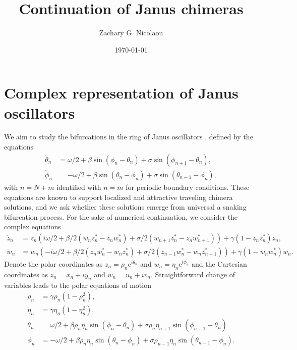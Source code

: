 \documentclass[aps,pre,amsmath,amssymb,floatfix,onecolumn,notitlepage,10pt]{revtex4-1}
\begin{document}
\title{Continuation of Janus chimeras}
\author{Zachary G. Nicolaou}
\date{\today}

\maketitle

\section{Complex  representation of Janus oscillators}
We aim to study the bifurcations in the ring of Janus oscillators \cite{2019_Nicolaou}, defined by the equations
\begin{align}
\dot{\theta}_n &= \omega/2 + \beta\sin(\phi_n - \theta_n) + \sigma \sin(\phi_{n+1}-\theta_n), \label{janus1}\\
\dot{\phi}_n &= -\omega/2 + \beta\sin(\theta_n - \phi_n) + \sigma \sin(\theta_{n-1}-\phi_n), \label{janus2}
\end{align}
with $n=N+m$ identified with $n=m$ for periodic boundary conditions. These equations are known to support localized and attractive traveling chimera solutions, and we ask whether these solutions emerge from universal a snaking bifurcation process.
For the sake of numerical continuation, we consider the complex equations
\begin{align}
\dot z_n &= z_n\left( i\omega/2 + \beta/2\left(w_nz_n^*-z_nw_n^*\right) + \sigma/2\left(w_{n+1}z_n^*-z_nw_{n+1}^*\right)\right) + \gamma\left(1-z_nz_n^*\right)z_n, \label{eom1} \\
\dot w_n &= w_n\left( -i\omega/2 + \beta/2\left(z_nw_n^*-w_nz_n^*\right) + \sigma/2\left(z_{n-1}w_n^*-w_nz_{n-1}^*\right)\right) + \gamma\left(1-w_nw_n^*\right)w_n. \label{eom2}
\end{align}
Denote the polar coordinates as $z_n = \rho_n{\mathrm e}^{i\theta_n}$ and $w_n = \eta_n{\mathrm e}^{i\phi_n}$ and the Cartesian coordinates as $z_n = x_n + iy_n$ and $w_n = u_n+iv_n$. Straightforward change of variables leads to the polar equations of motion
\begin{align}
\dot \rho_n &= \gamma \rho_n \left(1-\rho_n^2\right), \\
\dot \eta_n &=  \gamma \eta_n \left(1-\eta_n^2\right),  \\
\dot \theta_n &= \omega/2 + \beta \rho_n \eta_n \sin\left(\phi_n-\theta_n\right) + \sigma \rho_n\eta_{n+1}\sin\left(\phi_{n+1}-\theta_n\right)\\
\dot \phi_n &= -\omega/2 + \beta \rho_n \eta_n \sin\left(\theta_n-\phi_n\right) + \sigma \rho_{n-1} \eta_n\sin\left(\theta_{n-1}-\phi_n\right).
\end{align}
\end{document}
